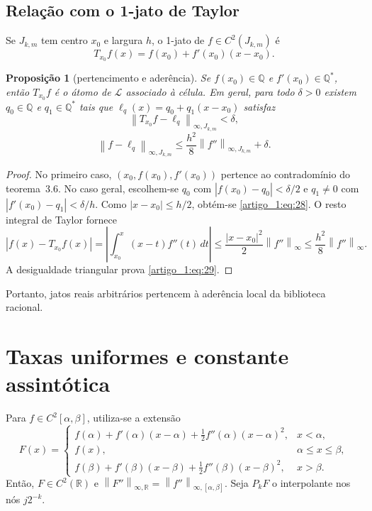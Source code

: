 \documentclass[12pt,a4paper]{article}
\theoremstyle{preciso}
\newtheorem{proposicao}[teorema]{Proposição}
\theoremstyle{definition}
\newcommand{\Q}{\mathbb Q}
\newcommand{\R}{\mathbb R}
\newcommand{\LL}{\mathcal L}
\newcommand{\norm}[1]{\left\|#1\right\|_{\infty}}
\newcommand{\normK}[2]{\left\|#1\right\|_{\infty,#2}}
\newcommand{\eqn}[2]{\begin{equation}\label{eq:#1}#2\end{equation}}
\theoremstyle{preciso}
\theoremstyle{preciso}
\theoremstyle{preciso}
\theoremstyle{preciso}
\theoremstyle{definition}
\theoremstyle{preciso}
\theoremstyle{definition}
\theoremstyle{preciso}
\theoremstyle{preciso}
\theoremstyle{definition}
\begin{document}
\subsection{Relação com o 1-jato de Taylor}
Se $J_{k,m}$ tem centro $x_0$ e largura $h$, o 1-jato de $f\in C^2(J_{k,m})$ é
\[
T_{x_0}f(x)=f(x_0)+f'(x_0)(x-x_0).
\]
\begin{proposicao}[pertencimento e aderência]\label{map:artigo_1:4.5}
Se $f(x_0)\in\Q$ e $f'(x_0)\in\Q^*$, então $T_{x_0}f$ é o átomo de $\LL$ associado à célula. Em geral, para todo $\delta>0$ existem $q_0\in\Q$ e $q_1\in\Q^*$ tais que $\ell_q(x)=q_0+q_1(x-x_0)$ satisfaz
\eqn{28}{\normK{T_{x_0}f-\ell_q}{J_{k,m}}<\delta,}
\eqn{29}{\normK{f-\ell_q}{J_{k,m}}\le\frac{h^2}8\normK{f''}{J_{k,m}}+\delta.}
\end{proposicao}
\begin{proof}
No primeiro caso, $(x_0,f(x_0),f'(x_0))$ pertence ao contradomínio do teorema~3.6. No caso geral, escolhem-se $q_0$ com $|f(x_0)-q_0|<\delta/2$ e $q_1\ne0$ com $|f'(x_0)-q_1|<\delta/h$. Como $|x-x_0|\le h/2$, obtém-se \eqref{artigo_1:eq:28}. O resto integral de Taylor fornece
\[
|f(x)-T_{x_0}f(x)|=\left|\int_{x_0}^x(x-t)f''(t)\,dt\right|
\le\frac{|x-x_0|^2}2\norm{f''}\le\frac{h^2}8\norm{f''}.
\]
A desigualdade triangular prova \eqref{artigo_1:eq:29}.
\end{proof}
Portanto, jatos reais arbitrários pertencem à aderência local da biblioteca racional.
\section{Taxas uniformes e constante assintótica}
Para $f\in C^2[\alpha,\beta]$, utiliza-se a extensão
\eqn{30}{F(x)=\begin{cases}
f(\alpha)+f'(\alpha)(x-\alpha)+\frac12f''(\alpha)(x-\alpha)^2,&x<\alpha,\\
f(x),&\alpha\le x\le\beta,\\
f(\beta)+f'(\beta)(x-\beta)+\frac12f''(\beta)(x-\beta)^2,&x>\beta.
\end{cases}}
Então, $F\in C^2(\R)$ e $\normK{F''}{\R}=\normK{f''}{[\alpha,\beta]}$. Seja $P_kF$ o interpolante nos nós $j2^{-k}$.
\end{document}
